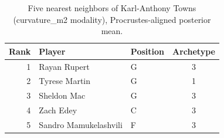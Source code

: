 \begin{table}[htbp]
  \centering\small
  \begin{tabular}{rllc}
    \toprule
    Rank & Player & Position & Archetype \\
    \midrule
    1 & Rayan Rupert & G & 3 \\
    2 & Tyrese Martin & G & 1 \\
    3 & Sheldon Mac & G & 3 \\
    4 & Zach Edey & C & 3 \\
    5 & Sandro Mamukelashvili & F & 3 \\
    \bottomrule
  \end{tabular}
  \caption{Five nearest neighbors of Karl-Anthony Towns (curvature_m2 modality), Procrustes-aligned posterior mean.}
  \label{tab:Karl_Anthony_Towns_neighbors_curvature_m2}
\end{table}

